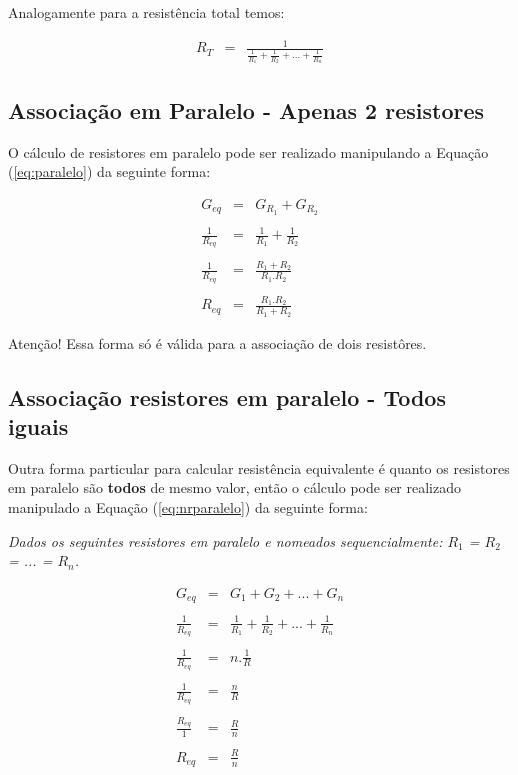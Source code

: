 Analogamente para a resistência total temos:

\begin{eqnarray}
	\label{eq:nrparalelo}
	R_T & = & \frac{1}{\frac{1}{R_1} + \frac{1}{R_2} + ... + \frac{1}{R_n} }
\end{eqnarray}


\subsection{Associação em Paralelo - Apenas 2 resistores}

O cálculo de resistores em paralelo pode ser realizado manipulando a Equação (\ref{eq:paralelo}) da seguinte forma:

\begin{eqnarray}
	G_{eq} & = & G_{R_1} + G_{R_2} \nonumber\\
	\nonumber\\
	\frac{1}{R_{eq}}	& = & \frac{1}{R_1} + \frac{1}{R_2} \nonumber\\
	\nonumber\\
	\frac{1}{R_{eq}}	& = & \frac{R_1 + R_2}{R_1.R_2} \nonumber\\
	\nonumber\\
	R_{eq}	& = & \frac{R_1.R_2}{R_1 + R_2} \nonumber
\end{eqnarray}

Atenção! Essa forma só é válida para a associação de dois resistôres.


\subsection{Associação resistores em paralelo - Todos iguais}

Outra forma particular para calcular resistência equivalente é quanto os resistores em paralelo são \textbf{todos} de mesmo valor, então o cálculo pode ser realizado manipulado a Equação (\ref{eq:nrparalelo}) da seguinte forma:

\textit{Dados os seguintes resistores em paralelo e nomeados sequencialmente: $R_1$ = $R_2$ = ... = $R_n$. }

\begin{eqnarray}
	G_{eq} & = & G_1 + G_2 + ... + G_n \nonumber\\
	\nonumber\\
	\frac{1}{R_{eq}} & = & \frac{1}{R_1} + \frac{1}{R_2} + ... + \frac{1}{R_n}\nonumber\\
	\nonumber\\
	\frac{1}{R_{eq}} & = & n.\frac{1}{R} \nonumber\\
	\nonumber\\
	\frac{1}{R_{eq}} & = & \frac{n}{R} \nonumber\\
	\nonumber\\
	\frac{R_{eq}}{1} & = & \frac{R}{n} \nonumber\\
	\nonumber\\
	R_{eq} & = & \frac{R}{n}
\end{eqnarray}

